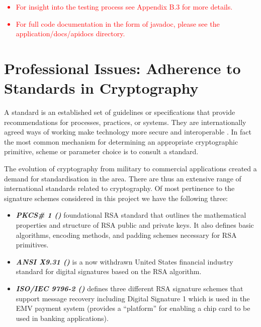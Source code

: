 \documentclass[]{final_report}
\theoremstyle{definition}
\begin{document}
\textcolor{red} {
\begin{itemize}
\item For insight into the testing process see Appendix B.3 for more details.
\item For full code documentation in the form of javadoc, please see the application/docs/apidocs directory.
\end{itemize}
}

\chapter{Professional Issues: Adherence to Standards in Cryptography}



A standard is an established set of guidelines or specifications that provide recommendations for processes, practices, or systems. They are internationally agreed ways of working make technology more secure and interoperable \cite{isoCryptography2024}. In fact the most common mechanism for determining an appropriate cryptographic primitive, scheme or parameter choice is to consult a standard. 

The evolution of cryptography from military to commercial applications created a demand for standardisation in the area. There are thus an extensive range of international standards related to cryptography.  Of most pertinence to the signature schemes considered in this project we have the following three:
\begin{itemize}

\item \textit{\textbf{PKCS\# 1 (\cite{rfc8017})}} 
foundational RSA standard that outlines the mathematical properties and structure of RSA public and private keys. It also defines basic algorithms, encoding methods, and padding schemes necessary for RSA primitives.
\item \textit{\textbf{ANSI X9.31 (\cite{ANSI-1998-X9-31})}} is a now withdrawn United States financial industry standard for digital signatures based on the RSA algorithm.
\item \textit{\textbf{ISO/IEC 9796-2 (\cite{ISO/2010/9796-2-2010})}} defines three different RSA signature schemes that support message recovery including Digital Signature 1 which is used in the EMV payment system (provides a “platform” for enabling a chip card to be used in banking applications).
\end{itemize}
\end{document}
